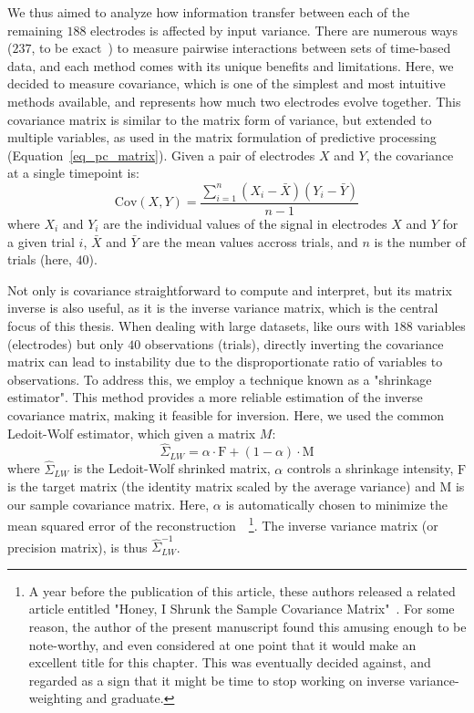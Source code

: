 We thus aimed to analyze how information transfer between each of the remaining $188$ electrodes is affected by input variance. There are numerous ways ($237$, to be exact~\cite{cliff2023unifying}) to measure pairwise interactions between sets of time-based data, and each method comes with its unique benefits and limitations. Here, we decided to measure covariance, which is one of the simplest and most intuitive methods available, and represents how much two electrodes evolve together. This covariance matrix is similar to the matrix form of variance, but extended to multiple variables, as used in the matrix formulation of predictive processing (Equation~\ref{eq_pc_matrix}). Given a pair of electrodes $X$ and $Y$, the covariance at a single timepoint is: 
\begin{equation}
    \text{Cov}(X, Y) = \frac{\sum_{i=1}^{n} (X_i - \bar{X})(Y_i - \bar{Y})}{n-1}
\end{equation}
where  \( X_i \) and \( Y_i \) are the individual values of the signal in electrodes \( X \) and \( Y \) for a given trial $i$, \( \bar{X} \) and \( \bar{Y} \) are the mean values accross trials, and $n$ is the number of trials (here, $40$).

Not only is covariance straightforward to compute and interpret, but its matrix inverse is also useful, as it is the inverse variance matrix, which is the central focus of this thesis. When dealing with large datasets, like ours with $188$ variables (electrodes) but only $40$ observations (trials), directly inverting the covariance matrix can lead to instability due to the disproportionate ratio of variables to observations. To address this, we employ a technique known as a "shrinkage estimator". This method provides a more reliable estimation of the inverse covariance matrix, making it feasible for inversion. Here, we used the common Ledoit-Wolf estimator, which given a matrix $M$: 
\begin{equation}
    \hat{\Sigma}_{LW} = \alpha \cdot \text{F} + (1 - \alpha) \cdot \text{M}
\end{equation}
where \( \hat{\Sigma}_{LW} \) is the Ledoit-Wolf shrinked matrix, \( \alpha \) controls a shrinkage intensity, \( \text{F} \) is the target matrix (the identity matrix scaled by the average variance) and \( \text{M} \) is our sample covariance matrix. Here, $\alpha$ is automatically chosen to minimize the mean squared error of the reconstruction~\cite{ledoit2004well}~\footnote{A year before the publication of this article, these authors released a related article entitled "Honey, I Shrunk the Sample Covariance Matrix"~\cite{ledoit2003honey}. For some reason, the author of the present manuscript found this amusing enough to be note-worthy, and even considered at one point that it would make an excellent title for this chapter. This was eventually decided against, and regarded as a sign that it might be time to stop working on inverse variance-weighting and graduate.}.
The inverse variance matrix (or precision matrix), is thus $\hat{\Sigma}_{LW}^{-1}$.

